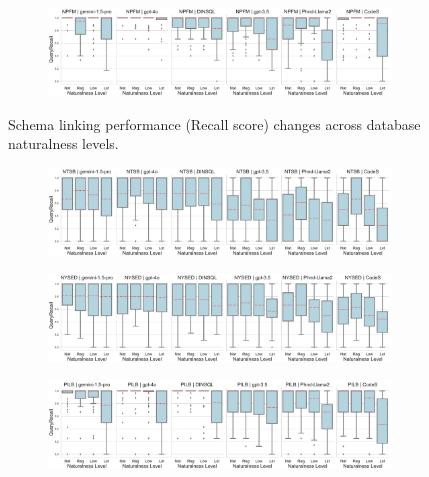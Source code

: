 \begin{figure}
\begin{subfigure}{\textwidth}
      \centering
      \includegraphics[width=\textwidth]{figures/natlevel-boxplots/natlevel-model-recall-boxplot-NPFM.pdf}
    \end{subfigure}
    \caption{Schema linking performance (Recall score) changes across database naturalness levels.}
    \label{fig:db-level-boxplots-recall-1}
  \end{figure}
  
  \begin{figure}
    \centering
    \begin{subfigure}{\textwidth}
      \centering
      \includegraphics[width=\textwidth]{figures/natlevel-boxplots/natlevel-model-recall-boxplot-NTSB.pdf}
    \end{subfigure}
    \begin{subfigure}{\textwidth}
      \centering
      \includegraphics[width=\textwidth]{figures/natlevel-boxplots/natlevel-model-recall-boxplot-NYSED.pdf}
    \end{subfigure}
    \begin{subfigure}{\textwidth}
      \centering
      \includegraphics[width=\textwidth]{figures/natlevel-boxplots/natlevel-model-recall-boxplot-PILB.pdf}

\end{subfigure}
\end{figure}
